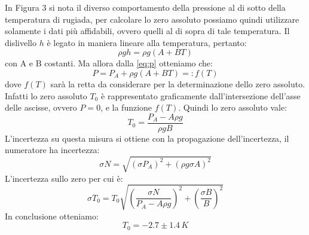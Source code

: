In Figura 3 si nota il diverso comportamento della pressione al di sotto della temperatura di rugiada, per calcolare lo zero assoluto possiamo quindi utilizzare solamente i dati più affidabili, ovvero quelli al di sopra di tale temperatura.
Il dislivello $h$ è legato in maniera lineare alla temperatura, pertanto:
\begin{equation}
\rho gh = \rho g (A + B T)
\end{equation}
con A e B costanti.
Ma allora dalla \eqref{eq:p} otteniamo che:
\begin{equation}
P = P_A + \rho g (A + B T) =:f (T)
\end{equation}
dove $f(T)$ sarà la retta da considerare per la determinazione dello zero assoluto.
Infatti lo zero assoluto $T_0$ è rappresentato graficamente dall'intersezione dell'asse delle ascisse, ovvero $P = 0$, e la funzione $f(T)$.
Quindi lo zero assoluto vale: 
\begin{equation}
\label{eq:zero}
T_0 = \frac{P_A - A \rho g}{\rho gB}
\end{equation}
L'incertezza su questa misura si ottiene con la propagazione dell'incertezza, il numeratore ha incertezza:
\begin{equation}
\sigma N = \sqrt{(\sigma P_A)^2 + (\rho g \sigma A)^2}
\end{equation}
L'incertezza sullo zero per cui è:
\begin{equation}
\label{eq:dzero}
\sigma T_0 = T_0\sqrt{\left(\frac{\sigma N}{P_A - A \rho g}\right)^2 +\left(\frac{\sigma B}{B}\right)^2 } 
\end{equation}
In conclusione otteniamo:
\[T_0 = -2.7 \pm 1.4 \, K \]


